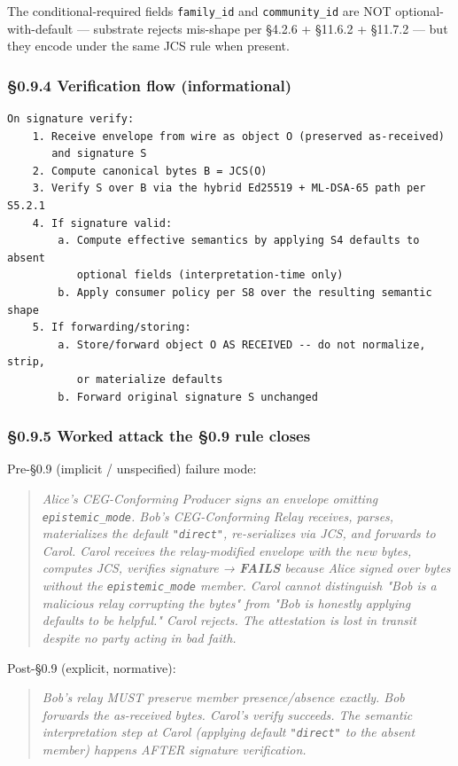 \documentclass[11pt]{article}
\begin{document}
The conditional-required fields \texttt{family\_id} and \texttt{community\_id} are NOT optional-with-default — substrate rejects mis-shape per §4.2.6 + §11.6.2 + §11.7.2 — but they encode under the same JCS rule when present.


\subsubsection*{§0.9.4 Verification flow (informational)}


\begin{lstlisting}
On signature verify:
    1. Receive envelope from wire as object O (preserved as-received)
       and signature S
    2. Compute canonical bytes B = JCS(O)
    3. Verify S over B via the hybrid Ed25519 + ML-DSA-65 path per S5.2.1
    4. If signature valid:
        a. Compute effective semantics by applying S4 defaults to absent
           optional fields (interpretation-time only)
        b. Apply consumer policy per S8 over the resulting semantic shape
    5. If forwarding/storing:
        a. Store/forward object O AS RECEIVED -- do not normalize, strip,
           or materialize defaults
        b. Forward original signature S unchanged
\end{lstlisting}

\subsubsection*{§0.9.5 Worked attack the §0.9 rule closes}


Pre-§0.9 (implicit / unspecified) failure mode:


\begin{quote}\itshape Alice's CEG-Conforming Producer signs an envelope omitting \texttt{epistemic\_mode}. Bob's CEG-Conforming Relay receives, parses, materializes the default \texttt{"direct"}, re-serializes via JCS, and forwards to Carol. Carol receives the relay-modified envelope with the new bytes, computes JCS, verifies signature → \textbf{FAILS} because Alice signed over bytes without the \texttt{epistemic\_mode} member. Carol cannot distinguish "Bob is a malicious relay corrupting the bytes" from "Bob is honestly applying defaults to be helpful." Carol rejects. The attestation is lost in transit despite no party acting in bad faith.\end{quote}


Post-§0.9 (explicit, normative):


\begin{quote}\itshape Bob's relay MUST preserve member presence/absence exactly. Bob forwards the as-received bytes. Carol's verify succeeds. The semantic interpretation step at Carol (applying default \texttt{"direct"} to the absent member) happens AFTER signature verification.\end{quote}
\end{document}
